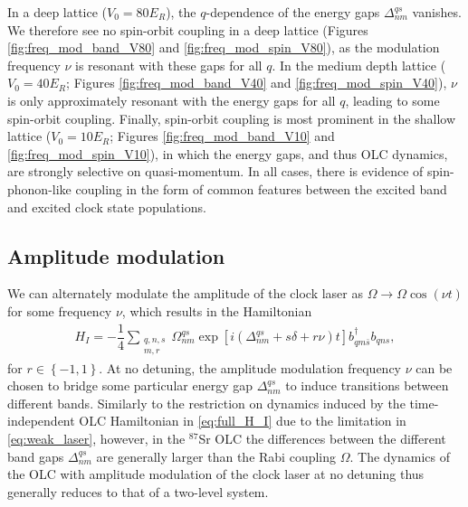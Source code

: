 \documentclass[aps,notitlepage,nofootinbib,11pt]{revtex4-1}
\newcommand{\f}[2]{\dfrac{#1}{#2}} %
\newcommand{\p}[1]{\left(#1\right)} %
\renewcommand{\sp}[1]{\left[#1\right]} %
\renewcommand{\set}[1]{\left\{#1\right\}} %
\newcommand{\1}{\mathds{1}}
\begin{document}
In a deep lattice ($V_0=80E_R$), the $q$-dependence of the energy gaps
$\Delta^{qs}_{nm}$ vanishes. We therefore see no spin-orbit coupling
in a deep lattice (Figures \ref{fig:freq_mod_band_V80} and
\ref{fig:freq_mod_spin_V80}), as the modulation frequency $\nu$ is
resonant with these gaps for all $q$. In the medium depth lattice
($V_0=40E_R$; Figures \ref{fig:freq_mod_band_V40} and
\ref{fig:freq_mod_spin_V40}), $\nu$ is only approximately resonant
with the energy gaps for all $q$, leading to some spin-orbit
coupling. Finally, spin-orbit coupling is most prominent in the
shallow lattice ($V_0=10E_R$; Figures \ref{fig:freq_mod_band_V10} and
\ref{fig:freq_mod_spin_V10}), in which the energy gaps, and thus OLC
dynamics, are strongly selective on quasi-momentum. In all cases,
there is evidence of spin-phonon-like coupling in the form of common
features between the excited band and excited clock state populations.


\subsection{Amplitude modulation}
\label{sec:amp_mod}

We can alternately modulate the amplitude of the clock laser as
$\Omega\to\Omega\cos\p{\nu t}$ for some frequency $\nu$, which results
in the Hamiltonian
\begin{align}
  H_I
  = -\f14\sum_{\substack{q,n,s\\m,r}} \Omega^{qs}_{nm}
  \exp\sp{i\p{\Delta^{qs}_{nm}+s\delta+r\nu}t}
  b_{qm\bar s}^\dag b_{qns},
  \label{eq:amp_mod_H}
\end{align}
for $r\in\set{-1,1}$. At no detuning, the amplitude modulation
frequency $\nu$ can be chosen to bridge some particular energy gap
$\Delta^{qs}_{nm}$ to induce transitions between different
bands. Similarly to the restriction on dynamics induced by the
time-independent OLC Hamiltonian in \eqref{eq:full_H_I} due to the
limitation in \eqref{eq:weak_laser}, however, in the ${}^{87}$Sr OLC
the differences between the different band gaps $\Delta^{qs}_{nm}$ are
generally larger than the Rabi coupling $\Omega$. The dynamics of the
OLC with amplitude modulation of the clock laser at no detuning thus
generally reduces to that of a two-level system.
\end{document}

